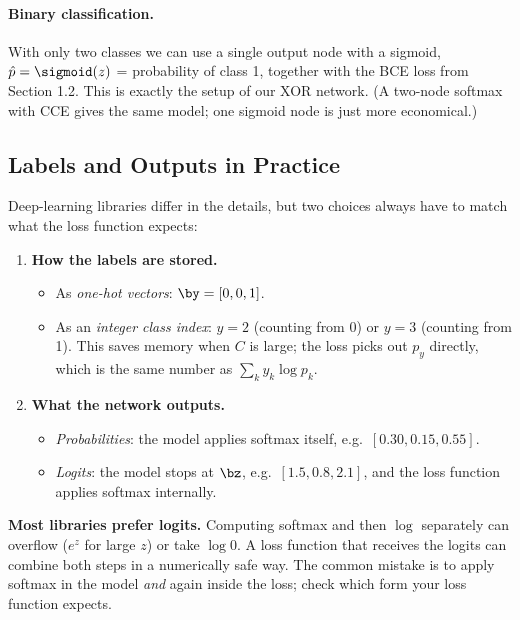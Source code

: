 \documentclass[12pt, a4paper]{article}
\begin{document}
\paragraph{Binary classification.}
With only two classes we can use a single output node with a sigmoid,
$\hat{p} = \sigmoid(z)$ = probability of class 1, together with the BCE
loss from Section 1.2. This is exactly the setup of our XOR network. (A
two-node softmax with CCE gives the same model; one sigmoid node is just more
economical.)

\subsection{Labels and Outputs in Practice}

Deep-learning libraries differ in the details, but two choices always have to
match what the loss function expects:

\begin{enumerate}
  \item \textbf{How the labels are stored.}
        \begin{itemize}[nosep]
          \item As \emph{one-hot vectors}: $\by = [0, 0, 1]$.
          \item As an \emph{integer class index}: $y = 2$ (counting from 0)
                or $y = 3$ (counting from 1). This saves memory when $C$ is
                large; the loss picks out $p_y$ directly, which is the same
                number as $\sum_k y_k \log p_k$.
        \end{itemize}
  \item \textbf{What the network outputs.}
        \begin{itemize}[nosep]
          \item \emph{Probabilities}: the model applies softmax itself,
                e.g.\ $[0.30, 0.15, 0.55]$.
          \item \emph{Logits}: the model stops at $\bz$,
                e.g.\ $[1.5, 0.8, 2.1]$, and the loss function applies
                softmax internally.
        \end{itemize}
\end{enumerate}

\begin{warnbox}
  \textbf{Most libraries prefer logits.} Computing softmax and then $\log$
  separately can overflow ($e^{z}$ for large $z$) or take $\log 0$. A loss
  function that receives the logits can combine both steps in a numerically
  safe way. The common mistake is to apply softmax in the model \emph{and}
  again inside the loss; check which form your loss function expects.
\end{warnbox}
\end{document}
